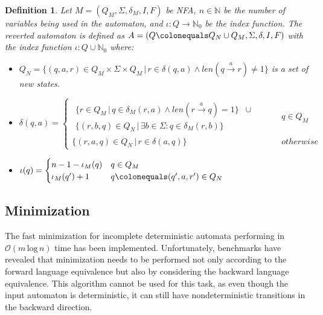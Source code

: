 \documentclass[pdflatex,sn-mathphys-num]{sn-jnl}%
\theoremstyle{thmstyleone}%
\theoremstyle{thmstyletwo}%
\theoremstyle{thmstylethree}%
\newtheorem{definition}{Definition}%
\begin{document}
        \begin{definition}
            Let $M = (Q_M, \Sigma, \delta_M, I, F)$ be NFA, $n \in \mathbb{N}$ be the number of variables being used in the automaton, and $\iota : Q \rightarrow \mathbb{N}_0$ be the index function. The reverted automaton is defined as $A = (Q \colonequals Q_N \cup Q_M, \Sigma, \delta, I, F)$ with the index function $\iota : Q \cup \mathbb{N}_0$ where:
            \begin{itemize}
                \item $Q_N = \{(q, a, r) \in Q_M \times \Sigma \times Q_M\,|\,r \in \delta(q, a) \land len(q \xrightarrow[]{a}r) \neq 1\}$ is a set of new states.
                \vspace*{0.5em}
                \item $\delta(q, a) =
                \begin{cases}
                    \begin{aligned}
                        \{r \in Q_M\,|\,q \in \delta_M(r, a) \land len(r \xrightarrow[]{a} q) = 1\}& \cup\\
                        \{(r, b, q) \in Q_N\,|\,\exists b \in \Sigma : q \in \delta_M(r, b)\}&
                    \end{aligned} \hspace{1cm} &q \in Q_M\\[1em]
                    \{(r, a, q) \in Q_N\,|\, r \in \delta(a, q)\}  & otherwise
                \end{cases}
                $
                \vspace*{0.5em}
                \item $\iota(q) =
                \begin{cases}
                    n - 1 - \iota_M(q) & q \in Q_M\\
                    \iota_M(q') + 1 & q \colonequals (q', a, r') \in Q_N

                \end{cases}
                $
            \end{itemize}
        \end{definition}

    \subsection{Minimization}
        The fast minimization for incomplete deterministic automata \cite{Minimization} performing in $\mathcal{O}(m\, \text{log}\, n)$ time has been implemented. Unfortunately, benchmarks have revealed that minimization needs to be performed not only according to the forward language equivalence but also by considering the backward language equivalence. This algorithm cannot be used for this task, as even though the input automaton is deterministic, it can still have nondeterministic transitions in the backward direction.
\end{document}
